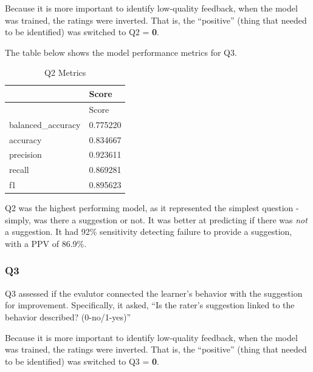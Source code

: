 \documentclass[
  letterpaper,
  DIV=11,
  numbers=noendperiod]{scrartcl}
\begin{document}
\begin{tcolorbox}[enhanced jigsaw, titlerule=0mm, left=2mm, colbacktitle=quarto-callout-note-color!10!white, breakable, colback=white, rightrule=.15mm, arc=.35mm, coltitle=black, opacityback=0, opacitybacktitle=0.6, bottomtitle=1mm, toptitle=1mm, bottomrule=.15mm, colframe=quarto-callout-note-color-frame, leftrule=.75mm, title=\textcolor{quarto-callout-note-color}{\faInfo}\hspace{0.5em}{Note}, toprule=.15mm]
Because it is more important to identify low-quality feedback, when the
model was trained, the ratings were inverted. That is, the ``positive''
(thing that needed to be identified) was switched to Q2 = \textbf{0}.
\end{tcolorbox}

The table below shows the model performance metrics for Q3.

\hypertarget{tbl-q2metrics}{}
\begin{longtable}[]{@{}ll@{}}
\caption{\label{tbl-q2metrics}Q2 Metrics}\tabularnewline
\toprule()
& Score \\
\midrule()
\endfirsthead
\toprule()
& Score \\
\midrule()
\endhead
balanced\_accuracy & 0.775220 \\
accuracy & 0.834667 \\
precision & 0.923611 \\
recall & 0.869281 \\
f1 & 0.895623 \\
\bottomrule()
\end{longtable}

Q2 was the highest performing model, as it represented the simplest
question - simply, was there a suggestion or not. It was better at
predicting if there was \emph{not} a suggestion. It had 92\% sensitivity
detecting failure to provide a suggestion, with a PPV of 86.9\%.

\hypertarget{q3}{%
\subsubsection{Q3}\label{q3}}

Q3 assessed if the evalutor connected the learner's behavior with the
suggestion for improvement. Specifically, it asked, ``Is the rater's
suggestion linked to the behavior described? (0-no/1-yes)''

\begin{tcolorbox}[enhanced jigsaw, titlerule=0mm, left=2mm, colbacktitle=quarto-callout-note-color!10!white, breakable, colback=white, rightrule=.15mm, arc=.35mm, coltitle=black, opacityback=0, opacitybacktitle=0.6, bottomtitle=1mm, toptitle=1mm, bottomrule=.15mm, colframe=quarto-callout-note-color-frame, leftrule=.75mm, title=\textcolor{quarto-callout-note-color}{\faInfo}\hspace{0.5em}{Note}, toprule=.15mm]
Because it is more important to identify low-quality feedback, when the
model was trained, the ratings were inverted. That is, the ``positive''
(thing that needed to be identified) was switched to Q3 = \textbf{0}.
\end{tcolorbox}
\end{document}

